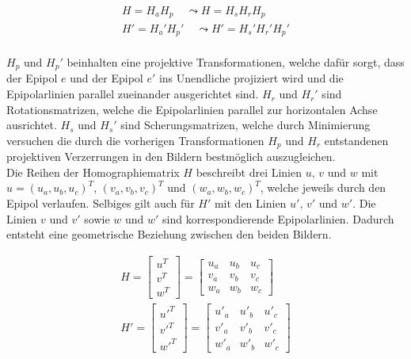 \begin{gather}
	H = H_a H_p  \;\;\;\; \leadsto	H = H_s H_r H_p \\
	H' = H_a'H_p'\;\;\;\; \leadsto 	H' = H_s'H_r' H_p'\\
\end{gather}


$H_p$ und $H_p'$ beinhalten eine projektive Transformationen, welche dafür sorgt, dass der Epipol $e$ und der Epipol $e'$ ins Unendliche projiziert wird und die Epipolarlinien parallel zueinander ausgerichtet sind\cite{ZZ,phdextrinsicPara}. $H_r$ und $H_r'$ sind Rotationsmatrizen, welche die Epipolarlinien parallel zur horizontalen Achse ausrichtet. $H_s$ und $H_s'$ sind Scherungsmatrizen, welche durch Minimierung versuchen die durch die vorherigen Transformationen $H_p$ und $H_r$ entstandenen projektiven Verzerrungen in den Bildern bestmöglich auszugleichen\cite{ZZ,phdextrinsicPara}.\\

Die Reihen der Homographiematrix $H$ beschreibt drei Linien $u, \, v$ und $w$ mit $u = (u_a,u_b,u_c)^T$, $(v_a,v_b,v_c)^T$ und $(w_a,w_b,w_c)^T$, welche jeweils durch den Epipol verlaufen. Selbiges gilt auch für $H'$ mit den Linien $u', \, v'$ und $w'$. Die Linien $v$ und $v'$ sowie $w$ und $w'$ sind korrespondierende Epipolarlinien. Dadurch entsteht eine geometrische Beziehung zwischen den beiden Bildern\cite{ZZ}.

\begin{gather}
	H = \begin{bmatrix}
		u^T\\v^T\\w^T
	\end{bmatrix} =
	\begin{bmatrix}
		u_a&u_b&u_c\\
		v_a&v_b&v_c\\
		w_a&w_b&w_c
	\end{bmatrix}\\
	H' = \begin{bmatrix}
		u'^T\\v'^T\\w'^T
	\end{bmatrix} =
	\begin{bmatrix}
		u'_a&u'_b&u'_c\\
		v'_a&v'_b&v'_c\\
		w'_a&w'_b&w'_c
	\end{bmatrix}	
\end{gather}\\

